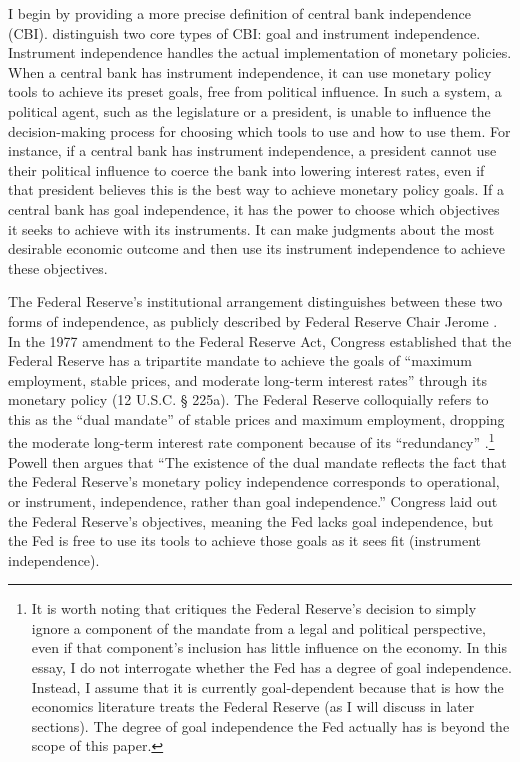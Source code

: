 \documentclass[12pt,a4paper]{article}
\begin{document}
\begin{doublespace}
I begin by providing a more precise definition of central bank independence (CBI). \textcite{debelle_how_1994} distinguish two core types of CBI: goal and instrument independence. Instrument independence handles the actual implementation of monetary policies. When a central bank has instrument independence, it can use monetary policy tools to achieve its preset goals, free from political influence. In such a system, a political agent, such as the legislature or a president, is unable to influence the decision-making process for choosing which tools to use and how to use them. For instance, if a central bank has instrument independence, a president cannot use their political influence to coerce the bank into lowering interest rates, even if that president believes this is the best way to achieve monetary policy goals. If a central bank has goal independence, it has the power to choose which objectives it seeks to achieve with its instruments. It can make judgments about the most desirable economic outcome and then use its instrument independence to achieve these objectives. 



The Federal Reserve's institutional arrangement distinguishes between these two forms of independence, as publicly described by Federal Reserve Chair Jerome \textcite{powell_panel_2023}. In the 1977 amendment to the Federal Reserve Act, Congress established that the Federal Reserve has a tripartite mandate to achieve the goals of ``maximum employment, stable prices, and moderate long-term interest rates'' through its monetary policy (12 U.S.C. § 225a). The Federal Reserve colloquially refers to this as the ``dual mandate'' of stable prices and maximum employment, dropping the moderate long-term interest rate component because of its ``redundancy'' \parencite[15]{downey_our_2025}.\footnote{It is worth noting that \textcite{downey_our_2025} critiques the Federal Reserve's decision to simply ignore a component of the mandate from a legal and political perspective, even if that component's inclusion has little influence on the economy. In this essay, I do not interrogate whether the Fed has a degree of goal independence. Instead, I assume that it is currently goal-dependent because that is how the economics literature treats the Federal Reserve (as I will discuss in later sections). The degree of goal independence the Fed actually has is beyond the scope of this paper.} Powell then argues that ``The existence of the dual mandate reflects the fact that the Federal Reserve's monetary policy independence corresponds to operational, or instrument, independence, rather than goal independence.'' Congress laid out the Federal Reserve's objectives, meaning the Fed lacks goal independence, but the Fed is free to use its tools to achieve those goals as it sees fit (instrument independence).


\end{doublespace}
\end{document}
